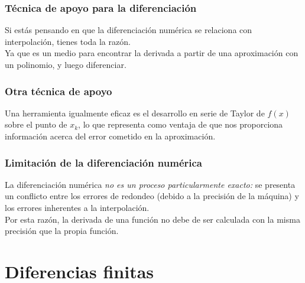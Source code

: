 \begin{frame}
\frametitle{Técnica de apoyo para la diferenciación}
Si estás pensando en que la diferenciación numérica se relaciona con interpolación, tienes toda la razón.
\\
\bigskip
Ya que es un medio para encontrar la derivada a partir de una aproximación con un polinomio, y luego diferenciar.
\end{frame}
\begin{frame}
\frametitle{Otra técnica de apoyo}
Una herramienta igualmente eficaz es el desarrollo en serie de Taylor de $f(x)$ sobre el punto de $x_{k}$, lo que representa como ventaja de que nos proporciona información acerca del error cometido en la aproximación.
\end{frame}
\begin{frame}
\frametitle{Limitación de la diferenciación numérica}
La diferenciación numérica \emph{no es un proceso particularmente exacto:} se presenta un conflicto entre los errores de redondeo (debido a la precisión de la máquina) y los errores inherentes a la interpolación.
\\
\bigskip
Por esta razón, la derivada de una función no debe de ser calculada con la misma precisión que la propia función.
\end{frame}
\section{Diferencias finitas}
